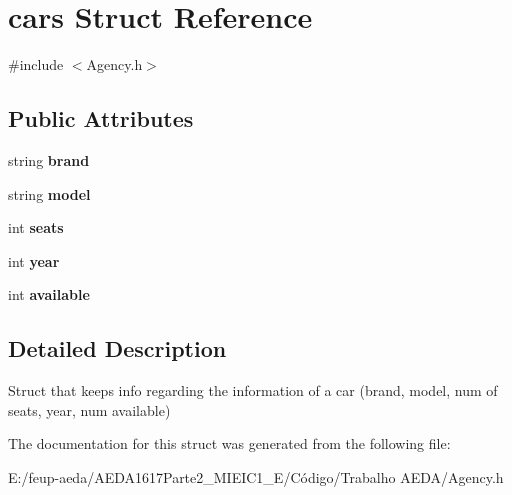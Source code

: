 \hypertarget{structcars}{}\section{cars Struct Reference}
\label{structcars}


{\ttfamily \#include $<$Agency.\+h$>$}

\subsection*{Public Attributes}
\begin{DoxyCompactItemize}
\item 
string {\bfseries brand}
\item 
string {\bfseries model}
\item 
int {\bfseries seats}
\item 
int {\bfseries year}
\item 
int {\bfseries available}
\end{DoxyCompactItemize}


\subsection{Detailed Description}
Struct that keeps info regarding the information of a car (brand, model, num of seats, year, num available) 

The documentation for this struct was generated from the following file\+:\begin{DoxyCompactItemize}
\item 
E\+:/feup-\/aeda/\+A\+E\+D\+A1617\+Parte2\+\_\+M\+I\+E\+I\+C1\+\_\+\+E/\+Código/\+Trabalho A\+E\+D\+A/Agency.\+h\end{DoxyCompactItemize}
